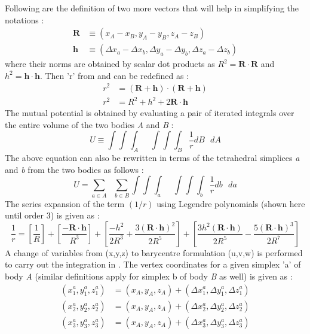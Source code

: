 %
Following are the definition of two more vectors that will help in simplifying the notations \cite{werner_poly}:
\begin{align}
\mathbf{R} &\equiv (x_A - x_B, y_A - y_B, z_A - z_B)\\
\mathbf{h} &\equiv (\Delta x_a - \Delta x_b, \Delta y_a - \Delta y_b, \Delta z_a - \Delta z_b)
\end{align}
%
where their norms are obtained by scalar dot products as $R^2 = \mathbf{R} \cdot \mathbf{R}$ and $h^2 = \mathbf{h} \cdot \mathbf{h}$. Then 'r' from  and  can be redefined as \cite{werner_poly}:
\begin{align}
\label{r_def3}
r^2 &= (\mathbf{R} + \mathbf{h}) \cdot (\mathbf{R} + \mathbf{h}) \\
r^2 &= R^2 + h^2 + 2\mathbf{R} \cdot \mathbf{h}
\end{align}
%
The mutual potential is obtained by evaluating a pair of iterated integrals over the entire volume of the two bodies \textit{A} and \textit{B} \cite{werner_poly}:
\begin{equation}
\label{u_def1}
U \equiv \int \int \int_A \text{ } \int \int \int_B \frac{1}{r} dB \text{ } dA
\end{equation}
%
The above equation can also be rewritten in terms of the tetrahedral simplices \textit{a} and \textit{b} from the two bodies as follows \cite{werner_poly}:
\begin{equation}
\label{u_def2}
U = \sum_{a\in A} \text{ } \sum_{b\in B} \int \int \int_a \text{ } \int \int \int_b \frac{1}{r} db \text{ } da
\end{equation}
%
The series expansion of the term $(1/r)$ using Legendre polynomials (shown here until order 3) is given as \cite{werner_poly}:
\begin{equation}
\label{r_exp}
\frac{1}{r} = \left[\frac{1}{R}\right] + \left[\frac{-\mathbf{R} \cdot \mathbf{h}}{R^3}\right] + \left[\frac{-h^2}{2R^3} + \frac{3(\mathbf{R} \cdot \mathbf{h})^2}{2R^5}\right] + \left[\frac{3h^2(\mathbf{R} \cdot \mathbf{h})}{2R^5} - \frac{5(\mathbf{R} \cdot \mathbf{h})^3}{2R^7}\right]
\end{equation}
%
A change of variables from (x,y,z) to barycentre formulation (u,v,w) is performed to carry out the integration in  \cite{werner_poly}. The vertex coordinates for a given simplex 'a' of body \textit{A} (similar definitions apply for simplex b of body \textit{B} as well) is given as \cite{werner_poly}:
\begin{align}
(x_1^a, y_1^a, z_1^a) &= (x_A,y_A,z_A) + (\Delta x_1^a, \Delta y_1^a, \Delta z_1^a)\\
(x_2^a, y_2^a, z_2^a) &= (x_A,y_A,z_A) + (\Delta x_2^a, \Delta y_2^a, \Delta z_2^a)\\
(x_3^a, y_3^a, z_3^a) &= (x_A,y_A,z_A) + (\Delta x_3^a, \Delta y_3^a, \Delta z_3^a)
\end{align}
